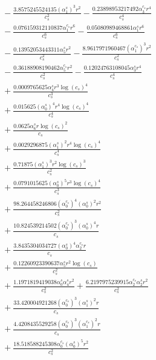 \documentclass[10pt]{article}
\begin{document}
\begin{align*}
&{}  - \frac{3.8575245524135 \left(\alpha_{1}^s\right)^{3} r^{2}}{c_{s}^{2}} - \frac{0.23898953217492 \alpha_{3}^{c_s} r^{4}}{c_{s}^{4}} \\
&{}  - \frac{0.076159312110837 \alpha_{1}^{c_s} r^{6}}{c_{s}^{6}} - \frac{0.05080989468861 \alpha_{1}^s r^{6}}{c_{s}^{6}} \\
&{}  - \frac{0.13952053443311 \alpha_{5}^s r^{2}}{c_{s}^{2}} - \frac{8.9617971960467 \left(\alpha_{1}^{c_s}\right)^{3} r^{2}}{c_{s}^{2}} \\
&{}  - \frac{0.36188908190462 \alpha_{5}^{c_s} r^{2}}{c_{s}^{2}} - \frac{0.12024763108045 \alpha_{3}^s r^{4}}{c_{s}^{4}} \\
&{}  + \frac{0.0009765625 \alpha_{4}^s r^{3} \log{\left(c_{s} \right)}^{4}}{c_{s}^{3}} \\
&{}  + \frac{0.015625 \left(\alpha_{0}^s\right)^{4} r^{4} \log{\left(c_{s} \right)}^{4}}{c_{s}^{4}} \\
&{}  + \frac{0.0625 \alpha_{6}^s r \log{\left(c_{s} \right)}^{2}}{c_{s}} \\
&{}  + \frac{0.0029296875 \left(\alpha_{1}^s\right)^{2} r^{4} \log{\left(c_{s} \right)}^{4}}{c_{s}^{4}} \\
&{}  + \frac{0.71875 \left(\alpha_{1}^s\right)^{3} r^{2} \log{\left(c_{s} \right)}^{3}}{c_{s}^{2}} \\
&{}  + \frac{0.0791015625 \left(\alpha_{0}^s\right)^{5} r^{3} \log{\left(c_{s} \right)}^{4}}{c_{s}^{3}} \\
&{}  + \frac{98.264458246806 \left(\alpha_{0}^{c_s}\right)^{4} \left(\alpha_{0}^s\right)^{2} r^{2}}{c_{s}^{2}} \\
&{}  + \frac{10.824539214502 \left(\alpha_{0}^{c_s}\right)^{3} \left(\alpha_{0}^s\right)^{4} r}{c_{s}} \\
&{}  + \frac{3.8435304034727 \left(\alpha_{0}^s\right)^{4} \alpha_{2}^{c_s} r}{c_{s}} \\
&{}  + \frac{0.12260923390637 \alpha_{5}^s r^{2} \log{\left(c_{s} \right)}}{c_{s}^{2}} \\
&{}  + \frac{1.1971819419038 \alpha_{0}^s \alpha_{4}^s r^{2}}{c_{s}^{2}} + \frac{6.2197975239915 \alpha_{2}^{c_s} \alpha_{2}^s r^{2}}{c_{s}^{2}} \\
&{}  + \frac{33.420004921268 \left(\alpha_{0}^{c_s}\right)^{3} \left(\alpha_{1}^s\right)^{2} r}{c_{s}} \\
&{}  + \frac{4.4208435529258 \left(\alpha_{0}^{c_s}\right)^{3} \left(\alpha_{1}^{c_s}\right)^{2} r}{c_{s}} \\
&{}  + \frac{18.518588245308 \alpha_{0}^{c_s} \left(\alpha_{0}^s\right)^{5} r^{2}}{c_{s}^{2}} \\

\end{align*}
\end{document}
